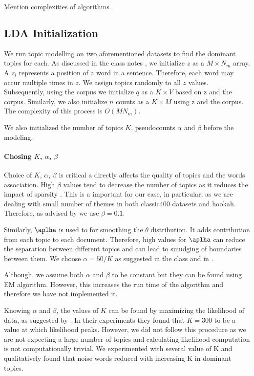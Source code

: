 \documentclass[11pt,a4paper,oneside]{article}
\begin{document}
Mention complexities of algorithms.

\subsection{LDA Initialization}
We run topic modelling on two aforementioned datasets to find the dominant topics for each. As discussed in the class notes \cite{classNotes}, we initialize $z$ as a $M \times N_m$ array. A $z_i$ represents a position of a word in a sentence. Therefore, each word may occur multiple times in $z$. We assign topics randomly to all $z$ values.  Subsequently, using the corpus we initialize $q$ as a $K \times V$ based on z and the corpus. Similarly, we also initialize $n$ counts as a $K \times M$ using z and the corpus. The complexity of this process is $O(MN_m)$.

We also initialized the number of topics $K$, pseudocounts $\alpha$ and $\beta$ before the modeling.

\paragraph{Chosing $K$, $\alpha$, $\beta$}
Choice of $K$, $\alpha$, $\beta$ is critical a directly affects the quality of topics and the words association. High $\beta$ values tend to decrease the number of topics as it reduces the impact of sparsity \cite{griffiths2004finding}. This is a important for our case, in particular, as we are dealing with small number of themes in both classic400 datasets and hookah. Therefore, as advised by \cite{griffiths2004finding} we use $\beta = 0.1$. 

Similarly, $\aplha$ is used to for smoothing the $\theta$ distribution. It adds contribution from each topic to each document. Therefore, high values for $\aplha$ can reduce the separation between different topics and can lead to smudging of boundaries between them. We choose $\alpha = 50/K$ as suggested in the class and in \cite{griffiths2004finding}.

Although, we assume both $\alpha$ and $\beta$ to be constant but they can be found using EM algorithm. However, this increases the run time of the algorithm and therefore we have not implemented it.

Knowing $\alpha$ and $\beta$, the values of $K$ can be found by maximizing the likelihood of data, as suggested by \cite{griffiths2004finding}. In their experiments they found that $K = 300$ to be a value at which likelihood peaks. However, we did not follow this procedure as we are not expecting a large number of topics and calculating likelihood computation is not computationally trivial. We experimented with several value of K and qualitatively found that noise words reduced with increasing K in dominant topics.
\end{document}
